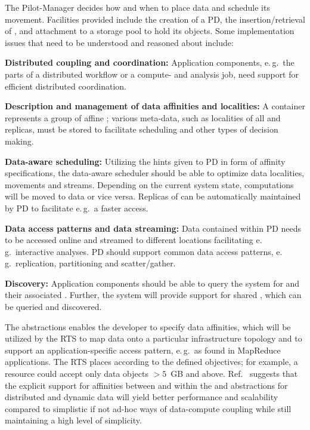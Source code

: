 \documentclass[conference]{IEEEtran}
\begin{document}
The Pilot-Manager decides how and when to place data and
schedule its movement. Facilities provided include the creation of a
PD, the insertion/retrieval of \dataunits, and attachment to a storage
pool to hold its objects. Some implementation issues that need to be
understood and reasoned about include:


\begin{compactitem}
\item \textbf{Distributed coupling and coordination:} Application
  components, e.\,g.\ the parts of a distributed workflow or a
  compute- and analysis job, need support for efficient distributed
  coordination.
\item \textbf{Description and management of data affinities and
    localities:} A \pd container represents a group of affine
  \dataunits; %
  various meta-data, such as localities of all \dataunits and
  replicas, must be stored to facilitate scheduling and other types of
  decision making.
\item \textbf{Data-aware scheduling:} Utilizing the hints given to PD
  in form of affinity specifications, the data-aware scheduler should
  be able to optimize data localities, movements and
  streams. Depending on the current system state, computations will be
  moved to data or vice versa. Replicas of \dataunits can be
  automatically maintained by PD to facilitate e.\,g.\ a faster
  access.
\item \textbf{Data access patterns and data streaming:} Data contained
  within PD needs to be accessed online and streamed to different
  locations facilitating e.\,g.\ interactive analyses.  PD should
  support common data access patterns, e.\,g.\ replication,
  partitioning and scatter/gather.
\item \textbf{Discovery:} Application components should be able to
  query the system for \dataunits and their associated
  \pilots. Further, the system will provide support for shared \dus,
  which can be queried and discovered.
\end{compactitem}

The abstractions enables the
developer to specify data affinities, which will be utilized by the RTS to
map data onto a particular infrastructure topology and to support an
application-specific access pattern, e.\,g.\ as found in MapReduce
applications. The RTS places \dataunits according to the defined
objectives; for example, a resource could accept only data objects
$>5$~GB and above.  Ref.~\cite{ddia_ptrsa10} suggests that the
explicit support for affinities between and within the \pj and \pd
abstractions for distributed and dynamic data will yield better
performance and scalability compared to simplistic if not ad-hoc ways
of data-compute coupling while still maintaining a high level of
simplicity.
\end{document}
